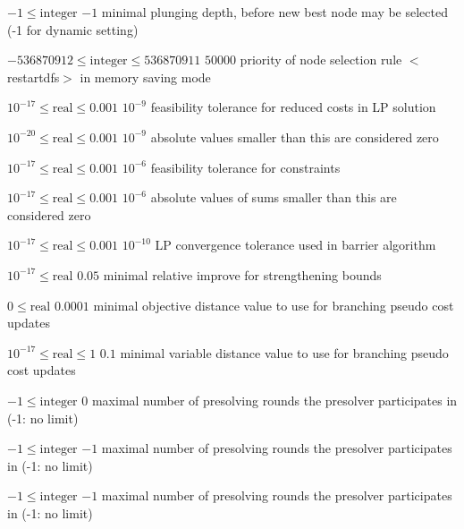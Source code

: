 %
{$-1\leq\textrm{integer}$}%
{$-1$}%
{minimal plunging depth, before new best node may be selected (-1 for dynamic setting)}%
{}

%
{$-536870912\leq\textrm{integer}\leq536870911$}%
{$50000$}%
{priority of node selection rule $<$restartdfs$>$ in memory saving mode}%
{}

%
{$10^{-17}\leq\textrm{real}\leq0.001$}%
{$10^{- 9}$}%
{feasibility tolerance for reduced costs in LP solution}%
{}

%
{$10^{-20}\leq\textrm{real}\leq0.001$}%
{$10^{- 9}$}%
{absolute values smaller than this are considered zero}%
{}

%
{$10^{-17}\leq\textrm{real}\leq0.001$}%
{$10^{- 6}$}%
{feasibility tolerance for constraints}%
{}

%
{$10^{-17}\leq\textrm{real}\leq0.001$}%
{$10^{- 6}$}%
{absolute values of sums smaller than this are considered zero}%
{}

%
{$10^{-17}\leq\textrm{real}\leq0.001$}%
{$10^{-10}$}%
{LP convergence tolerance used in barrier algorithm}%
{}

%
{$10^{-17}\leq\textrm{real}$}%
{$0.05$}%
{minimal relative improve for strengthening bounds}%
{}

%
{$0\leq\textrm{real}$}%
{$0.0001$}%
{minimal objective distance value to use for branching pseudo cost updates}%
{}

%
{$10^{-17}\leq\textrm{real}\leq1$}%
{$0.1$}%
{minimal variable distance value to use for branching pseudo cost updates}%
{}

%
{$-1\leq\textrm{integer}$}%
{$0$}%
{maximal number of presolving rounds the presolver participates in (-1: no limit)}%
{}

%
{$-1\leq\textrm{integer}$}%
{$-1$}%
{maximal number of presolving rounds the presolver participates in (-1: no limit)}%
{}

%
{$-1\leq\textrm{integer}$}%
{$-1$}%
{maximal number of presolving rounds the presolver participates in (-1: no limit)}%
{}

